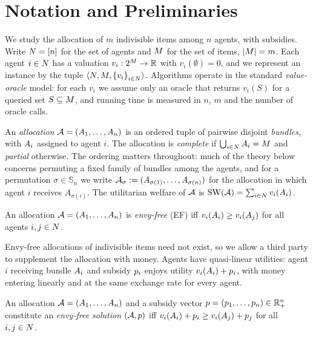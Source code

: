 \section{Notation and Preliminaries}
\label{sec:prelim}

We study the allocation of $m$ indivisible items among $n$ agents, with
subsidies. Write $N = [n]$ for the set of agents and $M$ for the set
of items, $\left\lvert M\right\rvert = m$. Each agent $i \in N$ has a valuation
$v_i : 2^{M} \to \mathbb{R}$ with $v_i(\emptyset) = 0$, and we represent an
instance by the tuple $\langle N, M, \left\{v_i\right\}_{i \in N}
\rangle$. Algorithms operate in the standard \emph{value-oracle} model: for each
$v_i$ we assume only an oracle that returns $v_i(S)$ for a queried set
$S \subseteq M$, and running time is measured in $n$, $m$ and the number of
oracle calls.

An \emph{allocation} $\mathcal{A} = (A_{1}, \dots, A_{n})$ is an ordered
tuple of pairwise disjoint \emph{bundles}, with $A_{i}$ assigned to agent
$i$. The allocation is \emph{complete} if $\bigcup_{i \in N} A_{i} =
M$ and \emph{partial} otherwise. The ordering matters throughout: much of
the theory below concerns permuting a fixed family of bundles among the agents,
and for a permutation $\sigma \in \mathbb{S}_n$ we write
$\mathcal{A}_\sigma := (A_{\sigma(1)}, \dots, A_{\sigma(n)})$ for the allocation in
which agent $i$ receives $A_{\sigma(i)}$. The utilitarian welfare of $\mathcal{A}$
is $\mathrm{SW}(\mathcal{A}) = \sum_{i \in N} v_i(A_{i})$.

\begin{definition}
\label{def:ef}
An allocation $\mathcal{A} = (A_{1},\dots,A_{n})$ is \emph{envy-free} (EF)
iff $v_i(A_{i}) \ge v_i(A_{j})$ for all agents $i, j \in N$.
\end{definition}

Envy-free allocations of indivisible items need not exist, so we allow a third
party to supplement the allocation with money. Agents have quasi-linear
utilities: agent $i$ receiving bundle $A_{i}$ and subsidy $p_i$
enjoys utility $v_i(A_{i}) + p_i$, with money entering linearly and
at the same exchange rate for every agent.

\begin{definition}
\label{def:efsolution}
An allocation $\mathcal{A} = (A_{1},\dots,A_{n})$ and a subsidy vector
$p = (p_1,\dots,p_n) \in \mathbb{R}^n_{+}$ constitute an
\emph{envy-free solution} $(\mathcal{A}, p)$ iff
$v_i(A_{i}) + p_i \ge v_i(A_{j}) + p_j$ for all
$i, j \in N$.
\end{definition}


